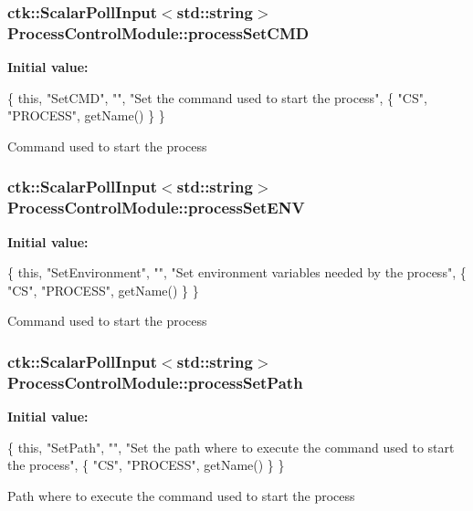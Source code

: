 \subsubsection[{\texorpdfstring{process\+Set\+C\+MD}{processSetCMD}}]{\setlength{\rightskip}{0pt plus 5cm}ctk\+::\+Scalar\+Poll\+Input$<$std\+::string$>$ Process\+Control\+Module\+::process\+Set\+C\+MD}\hypertarget{structProcessControlModule_a0f8c1a2b80ca32287fa60af12da681f7}{}\label{structProcessControlModule_a0f8c1a2b80ca32287fa60af12da681f7}
{\bfseries Initial value\+:}
\begin{DoxyCode}
\{ \textcolor{keyword}{this}, \textcolor{stringliteral}{"SetCMD"}, \textcolor{stringliteral}{""}, \textcolor{stringliteral}{"Set the command used to start the process"},
    \{ \textcolor{stringliteral}{"CS"}, \textcolor{stringliteral}{"PROCESS"}, getName() \} \}
\end{DoxyCode}
Command used to start the process 
\subsubsection[{\texorpdfstring{process\+Set\+E\+NV}{processSetENV}}]{\setlength{\rightskip}{0pt plus 5cm}ctk\+::\+Scalar\+Poll\+Input$<$std\+::string$>$ Process\+Control\+Module\+::process\+Set\+E\+NV}\hypertarget{structProcessControlModule_a95ed5208eb6265f71be5c96fa9b1bfd6}{}\label{structProcessControlModule_a95ed5208eb6265f71be5c96fa9b1bfd6}
{\bfseries Initial value\+:}
\begin{DoxyCode}
\{ \textcolor{keyword}{this}, \textcolor{stringliteral}{"SetEnvironment"}, \textcolor{stringliteral}{""}, \textcolor{stringliteral}{"Set environment variables needed by the process"},
    \{ \textcolor{stringliteral}{"CS"}, \textcolor{stringliteral}{"PROCESS"}, getName() \} \}
\end{DoxyCode}
Command used to start the process 
\subsubsection[{\texorpdfstring{process\+Set\+Path}{processSetPath}}]{\setlength{\rightskip}{0pt plus 5cm}ctk\+::\+Scalar\+Poll\+Input$<$std\+::string$>$ Process\+Control\+Module\+::process\+Set\+Path}\hypertarget{structProcessControlModule_a2f3edf4b64217d9242034e876b74271e}{}\label{structProcessControlModule_a2f3edf4b64217d9242034e876b74271e}
{\bfseries Initial value\+:}
\begin{DoxyCode}
\{ \textcolor{keyword}{this}, \textcolor{stringliteral}{"SetPath"}, \textcolor{stringliteral}{""},
      \textcolor{stringliteral}{"Set the path where to execute the command used to start the process"},
    \{ \textcolor{stringliteral}{"CS"}, \textcolor{stringliteral}{"PROCESS"}, getName() \} \}
\end{DoxyCode}
Path where to execute the command used to start the process 

